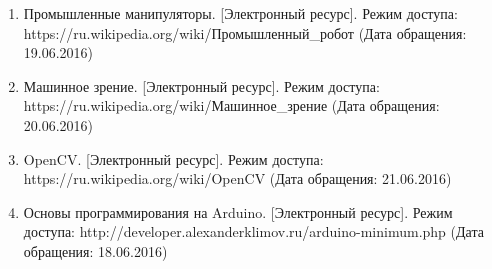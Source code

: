 \begin{enumerate}
\item Промышленные манипуляторы. [Электронный ресурс]. Режим доступа:
https://ru.wikipedia.org/wiki/Промышленный\_робот (Дата обращения: 19.06.2016)

\item Машинное зрение. [Электронный ресурс]. Режим доступа:
https://ru.wikipedia.org/wiki/Машинное\_зрение (Дата обращения: 20.06.2016)

\item OpenCV. [Электронный ресурс]. Режим доступа:
https://ru.wikipedia.org/wiki/OpenCV (Дата обращения: 21.06.2016)

\item Основы программирования на Arduino. [Электронный ресурс]. Режим доступа:
http://developer.alexanderklimov.ru/arduino-minimum.php (Дата обращения: 18.06.2016)
\end{enumerate}